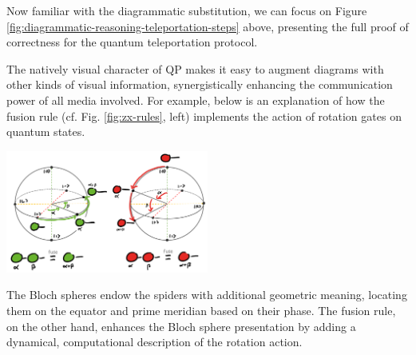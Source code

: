 
Now familiar with the diagrammatic substitution, we can focus on Figure \ref{fig:diagrammatic-reasoning-teleportation-steps} above, presenting the full proof of correctness for the quantum teleportation protocol.

The natively visual character of QP makes it easy to augment diagrams with other kinds of visual information, synergistically enhancing the communication power of all media involved.
For example, below is an explanation of how the fusion rule (cf. Fig. \ref{fig:zx-rules}, left) implements the action of rotation gates on quantum states.
\begin{center}
    \includegraphics[width=0.5\textwidth]{Sections/pictures/spider-states.png}
\end{center}
The Bloch spheres endow the spiders with additional geometric meaning, locating them on the equator and prime meridian based on their phase.
The fusion rule, on the other hand, enhances the Bloch sphere presentation by adding a dynamical, computational description of the rotation action.

